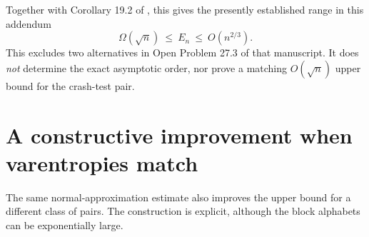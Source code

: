 \documentclass[11pt,a4paper]{article}
\begin{document}
Together with Corollary 19.2 of \cite{mikulik}, this gives the presently
established range in this addendum
\begin{equation}\label{eq:range}
\boxed{\Omega(\sqrt n)\ \le\ E_n\ \le\ O(n^{2/3}).}
\end{equation}
This excludes two alternatives in Open Problem 27.3 of that manuscript.
It does \emph{not} determine the exact asymptotic order, nor prove a
matching $O(\sqrt n)$ upper bound for the crash-test pair.

\section{A constructive improvement when varentropies match}
The same normal-approximation estimate also improves the upper bound for
a different class of pairs. The construction is explicit, although the
block alphabets can be exponentially large.
\end{document}
